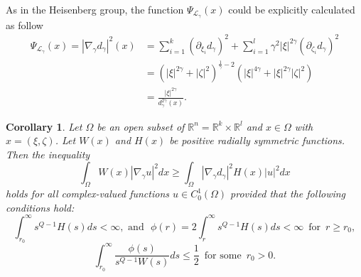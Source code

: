 \documentclass[a4paper,12pt,reqno]{amsart}
\theoremstyle{theorem}
\numberwithin{equation}{section}
\theoremstyle{plain}
\newtheorem{cor}[thm]{Corollary}
\theoremstyle{definition}
\theoremstyle{defi}
\begin{document}
	As in the Heisenberg group, the function $\Psi_{\mathcal{L}_{\gamma}}(x)$ could be explicitly calculated as follow
\begin{align*}
\Psi_{\mathcal{L}_{\gamma}}(x) = |\nabla_{\gamma} d_{\gamma}|^2(x) &= \sum_{i=1}^k (\partial_{\xi_i} d_{\gamma})^2 + \sum_{i=1}^l \gamma^2|\xi|^{2\gamma}(\partial_{\zeta_i} d_{\gamma})^2 \\
& = (|\xi|^{2\gamma} + |\zeta|^2)^{\frac{1}{\gamma}-2} (|\xi|^{4\gamma} + |\xi|^{2\gamma}|\zeta|^2)\\
& = \frac{|\xi|^{2\gamma}}{d_{\gamma}^{2\gamma}(x)}.
\end{align*}	
\begin{cor}\label{cor_BG}
Let $\Omega$ be an open subset of $\mathbb{R}^n=\mathbb{R}^k\times \mathbb{R}^l$ and $x\in \Omega$ with $x = (\xi,\zeta)$. Let $W(x)$ and $H(x)$ be positive radially symmetric functions. Then the inequality 
	\begin{equation}
	\int_{\Omega} W(x) |\nabla_{\gamma} u|^2 dx \geq \int_{\Omega} |\nabla_{\gamma} d_{\gamma}|^{2} H(x) |u|^2 dx
	\end{equation}
	holds for all complex-valued functions $u \in C^1_0(\Omega)$ provided that the following conditions hold: 
	\begin{equation}
	\int_{r_0}^{\infty} s^{Q-1}H(s)ds< \infty, \,\, \text{and} \,\, \,\,	\phi(r) = 2 \int_{r}^{\infty} s^{Q-1}H(s) ds < \infty \,\,\, \text{for} \,\,\, r\geq r_0,
	\end{equation}
	\begin{equation}
	\int_{r_0}^{\infty} \frac{\phi(s)}{s^{Q-1}W(s)} ds  \leq \frac{1}{2}\,\,\, \text{for some} \,\,\, r_0>0.
	\end{equation}
\end{cor}	
\end{document}
